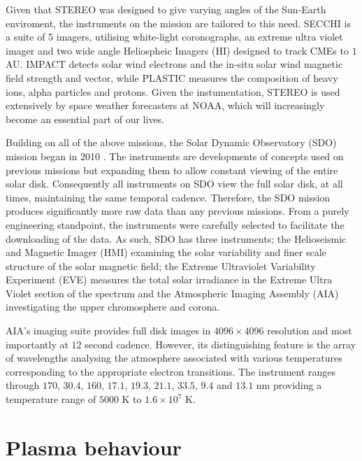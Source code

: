 Given that STEREO was designed to give varying angles of the Sun-Earth  enviroment, the instruments on the mission are tailored to this need.
SECCHI is a suite of 5 imagers, utilising white-light coronographs, an extreme ultra violet imager and two wide angle Heliospheic Imagers (HI) designed to track CMEs to $1$ AU.
IMPACT detects solar wind electrons and the in-situ solar wind magnetic field strength and vector, while PLASTIC measures the composition of heavy ions, alpha particles and protons. 
Given the instumentation, STEREO is used extensively by space weather forecasters at NOAA, which will increasingly become an essential part of our lives.

Building on all of the above missions, the Solar Dynamic Observatory (SDO) mission began in 2010 \cite{Kaiser2008}.
The instruments are developments of concepts used on previous missions but expanding them to allow constant viewing of the entire solar disk.
Consequently all instruments on SDO view the full solar disk, at all times, maintaining the same temporal cadence. 
Therefore, the SDO mission produces significantly more raw data than any previous missions.
From a purely engineering standpoint, the instruments were carefully selected to facilitate the downloading of the data.
As such, SDO has three instruments; the Helioseismic and Magnetic Imager (HMI) examining the solar variability and finer scale structure of the solar magnetic field; the Extreme Ultraviolet Variability Experiment (EVE) measures the total solar irradiance in the Extreme Ultra Violet section of the spectrum and the Atmospheric Imaging Assembly (AIA) investigating the upper chromosphere and corona.

AIA's imaging suite provides full disk images in $4096 \times 4096$ resolution and most importantly at $12$ second cadence.
However, its distinguishing feature is the array of wavelengths analysing the atmosphere \cite{AIAspec} associated with various temperatures corresponding to the appropriate electron transitions.
The instrument ranges through $170$, $30.4$, $160$, $17.1$, $19.3$, $21.1$, $33.5$, $9.4$ and $13.1$ nm providing a temperature range of $5000$ K to $1.6 \times 10^7$ K.




\section{Plasma behaviour}


